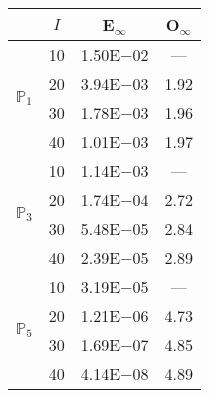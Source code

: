 \begin{table}[H]
\centering
\begin{tabular}{@{}l c c c@{}}
\toprule
 & $I$ & E$_{\infty}$ & O$_{\infty}$\\
\midrule
\multirow{4}{*}{$\mathbb{P}_{1}$}
 & 10 & 1.50E$-$02 & ---\\
 & 20 & 3.94E$-$03 & 1.92  \\
 & 30 & 1.78E$-$03 & 1.96  \\
 & 40 & 1.01E$-$03 & 1.97  \\
\midrule
\multirow{4}{*}{$\mathbb{P}_{3}$}
 & 10 & 1.14E$-$03 & ---\\
 & 20 & 1.74E$-$04 & 2.72  \\
 & 30 & 5.48E$-$05 & 2.84  \\
 & 40 & 2.39E$-$05 & 2.89  \\
\midrule
\multirow{4}{*}{$\mathbb{P}_{5}$}
 & 10 & 3.19E$-$05 & ---\\
 & 20 & 1.21E$-$06 & 4.73  \\
 & 30 & 1.69E$-$07 & 4.85  \\
 & 40 & 4.14E$-$08 & 4.89  \\
\bottomrule
\end{tabular}
\end{table}
